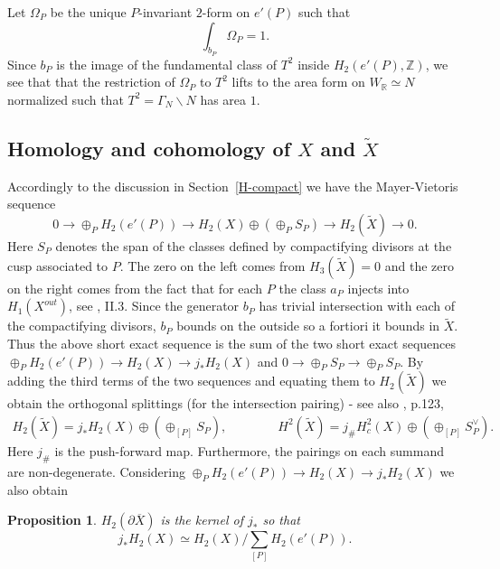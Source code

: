 \documentclass[12pt,leqno]{amsart}
\numberwithin{equation}{section}
\theoremstyle{plain}
\newtheorem{proposition}[theorem]{Proposition}
\theoremstyle{definition}
\theoremstyle{remark}
\newcommand{\R}{\mathbb{R}}
\newcommand{\Z}{\mathbb{Z}}
\newcommand{\G}{\Gamma}
\newcommand{\back}{\backslash}
\begin{document}
Let $\Omega_P$ be the unique $P$-invariant $2$-form on $e'(P)$ such that
\begin{equation}\label{areaform}
\int_{b_P} \Omega_P = 1.
\end{equation}
Since $b_P$ is the image of the fundamental class of $T^2$ inside $H_2(e'(P),\Z)$, we see that that the restriction of $\Omega_P$ to $T^2$ lifts to the area form on $W_{\R} \simeq N$ normalized such that $T^2=\G_N \back N$ has area $1$.








\subsection{Homology and cohomology of $X$ and $\tilde{X}$}

Accordingly to the discussion in Section~\ref{H-compact} we have the Mayer-Vietoris sequence
\[
0 \to \oplus_P H_2(e'(P)) \to H_2(X) \oplus (\oplus_P S_P)  \to H_2(\tilde{X}) \to 0.
\]
Here $S_{P}$ denotes the span of the classes defined by compactifying divisors at the cusp associated to $P$. The zero on the left comes from $H_3(\tilde{X}) =0$ and the zero on the right comes from the fact that for each $P$ the class $a_P$ injects into $H_1(X^{out})$, see \cite{vGeer}, II.3. Since the generator $b_P$ has trivial intersection with each of the compactifying divisors, $b_P$ bounds on the outside so a fortiori it bounds in $\tilde{X}$. Thus the above short exact sequence is the sum
of the two short exact sequences $\oplus_P H_2(e'(P)) \to H_2(X) \to j_{\ast} H_2(X)$ and
$ 0 \to \oplus_P S_P \to \oplus_P S_P $.  By adding the third terms of the two sequences and equating them to $H_2(\tilde{X})$  we obtain the orthogonal splittings (for the intersection pairing) - see also \cite{vGeer}, p.123,
\begin{align*}\label{vdG2}
H_2(\tilde{X}) = j_{\ast} H_2(X) \oplus \left( \oplus_{[P]} S_{P} \right), \qquad \qquad 
H^2(\tilde{X})  = j_{\#} H_c^2(X) \oplus \left(\oplus_{[P]} S^{\vee}_{P}\right).
\end{align*}
Here $j_{\#}$ is the push-forward map. Furthermore, the pairings on each summand are non-degenerate. Considering $\oplus_P H_2(e'(P)) \to H_2(X) \to j_{\ast} H_2(X)$ we also obtain
\begin{proposition}\label{intersectionhom}
$H_2(\partial \overline{X})$ is the kernel of $j_{\ast}$ so that
\[
j_{\ast} H_2(X) \simeq H_2(X)/ \sum_{[P]} H_2(e'(P)).
\]
\end{proposition}
\end{document}
